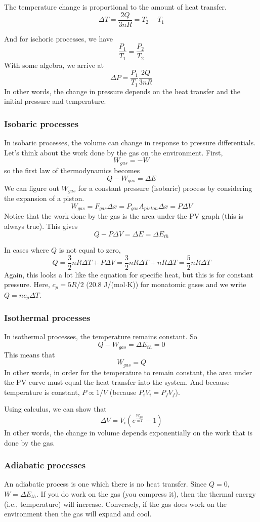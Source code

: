 The temperature change is proportional to the amount of heat transfer.
$$\Delta{T}=\frac{2Q}{3nR}=T_2-T_1$$

And for ischoric processes, we have
$$\frac{P_1}{T_1}=\frac{P_2}{T_2}$$
With some algebra, we arrive at
$$\Delta{P}=\frac{P_1}{T_1}\frac{2Q}{3nR}$$
In other words, the change in pressure depends on the heat transfer and the initial pressure and temperature.

\subsubsection{Isobaric processes}
In isobaric processes, the volume can change in response to pressure differentials. Let's think about the work done by the gas on the environment. First,
$$W_{gas}=-W$$
so the first law of thermodynamics becomes
$$Q-W_{gas}=\Delta{E}$$
We can figure out $W_{gas}$ for a constant pressure (isobaric) process by considering the expansion of a piston.
$$W_{gas}=F_{gas}\Delta{x}=P_{gas}A_{piston}\Delta{x}=P\Delta{V}$$
Notice that the work done by the gas is the area under the PV graph (this is always true). This gives
$$Q-P\Delta{V}=\Delta{E}=\Delta{E_{th}}$$

In cases where $Q$ is not equal to zero,
$$Q=\frac{3}{2}nR\Delta{T}+P\Delta{V}=\frac{3}{2}nR\Delta{T}+nR\Delta{T}=\frac{5}{2}nR\Delta{T}$$
Again, this looks a lot like the equation for specific heat, but this is for constant pressure. Here, $c_p=5R/2$ (20.8 J/(mol$\cdot$K)) for monatomic gases and we write $Q=nc_p\Delta{T}$.

\subsubsection{Isothermal processes}
In isothermal processes, the temperature remains constant. So
$$Q-W_{gas}=\Delta{E_{th}}=0$$
This means that 
$$W_{gas}=Q$$
In other words, in order for the temperature to remain constant, the area under the PV curve must equal the heat transfer into the system. And because temperature is constant, $P\propto{1/V}$ (because $P_iV_i=P_fV_f$).

Using calculus, we can show that
$$\displaystyle\Delta V = V_i\left(e^{\frac{W_{gas}}{nrT}}-1\right)$$
In other words, the change in volume depends exponentially on the work that is done by the gas.

\subsubsection{Adiabatic processes}
An adiabatic process is one which there is no heat transfer. Since $Q=0$,
$W=\Delta E_{th}$. If you do work on the gas (you compress it), then the thermal energy (i.e., temperature) will increase. Conversely, if the gas does work on the environment then the gas will expand and cool.

